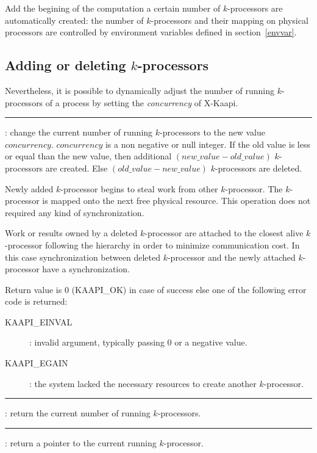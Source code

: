 \documentclass[12pt]{report}
\newcommand{\kaapi}{\textsc{X}-Kaapi\xspace}
\begin{document}
Add the begining of the computation a certain number of $k$-processors are automatically created: the number of $k$-processors and their mapping on physical processors are controlled by environment variables defined in section~\ref{envvar}.

\subsection{Adding or deleting $k$-processors}
Nevertheless, it is possible to dynamically adjust the number of running $k$-processors of a process by setting the \textit{concurrency} of \kaapi. 
\begin{description}
\vspace*{3ex} \hrule width 4cm
\item [\texttt{int kaapi\_set\_concurrency(int concurrency)}]: change the current number of running $k$-processors to the new value $concurrency$. $concurrency$ is a non negative or null integer. If the old value is less or equal than the new value, then additional $(new\_value - old\_value)$ $k$-processors are created. Else $(old\_value - new\_value)$ $k$-processors are deleted.

Newly added $k$-processor begins to steal work from other $k$-processor. The $k$-processor is mapped onto the next free physical resource. This operation does not required any kind of synchronization.

Work or results owned by a deleted $k$-processor are attached to the closest alive $k$-processor following the hierarchy in order to minimize communication cost. In this case synchronization between deleted $k$-processor and the newly attached $k$-processor have a synchronization.

Return value is $0$ (KAAPI\_OK) in case of success else one of the following error code is returned:
\begin{description}
\item [KAAPI\_EINVAL]: invalid argument, typically passing $0$ or a negative value.
\item [KAAPI\_EGAIN]: the system lacked the necessary resources to create another $k$-processor.
\end{description}

\vspace*{3ex} \hrule width 4cm
\item [\texttt{int kaapi\_get\_concurrency(void)}]: return the current number of running $k$-processors.

\vspace*{3ex} \hrule width 4cm
\item [\texttt{kaapi\_processor\_t* kaapi\_self\_processor(void)}]: return a pointer to the current running $k$-processor.

\end{description}
\end{document}
